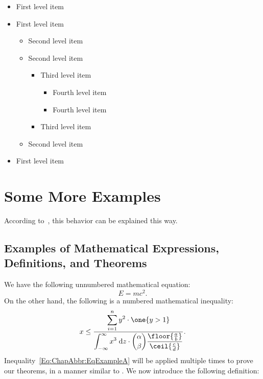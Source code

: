 \begin{itemize}
\item
First level item
\item
First level item
\begin{itemize}
\item
Second level item
\item
Second level item
\begin{itemize}
\item
Third level item
\begin{itemize}
\item
Fourth level item
\item
Fourth level item
\end{itemize}
\item
Third level item
\end{itemize}
\item
Second level item
\end{itemize}
\item
First level item
\end{itemize}


\section{Some More Examples}
\label{Section:ChapAbbr:SomeMoreExamples}

According to~\cite{IEEEexample:book_typical}, this behavior can be explained this way.
\lipsum[12]


\subsection{Examples of Mathematical Expressions, Definitions, and Theorems}
\label{Section:ChapAbbr:SomeMoreExamples:Math}

We have the following unnumbered mathematical equation:
\[
E=mc^2.
\]
On the other hand, the following is a numbered mathematical inequality:
\begin{align}
x \leq
\frac{\displaystyle\sum_{i=1}^{n} y^2 \cdot \one{y > 1}}
{\displaystyle\int_{-\infty}^{\infty} x^3 \;\text{d}z \cdot
\binom{\alpha}{\beta} \frac{\floor{\frac{a}{b}}}{\ceil{\frac{c}{d}}}}.
\label{Eq:ChapAbbr:EqExampleA}
\end{align}
Inequality~\eqref{Eq:ChapAbbr:EqExampleA} will be applied multiple times to prove our theorems, in a manner similar to \cite{IEEEexample:article_typical, IEEEexample:conf_typical}.
We now introduce the following definition:

